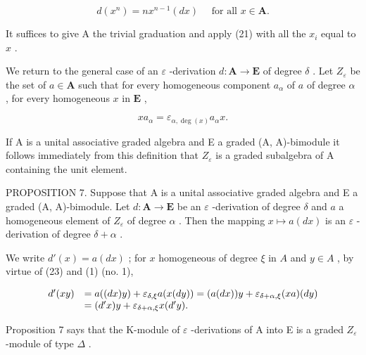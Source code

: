 \[
d (x ^ {n}) = n x ^ {n - 1} (d x) \quad \text { for all } x \in \mathbf {A}.\tag{22}
\]

It suffices to give A the trivial graduation and apply (21) with all the \(x_{i}\) equal to \(x\) .

We return to the general case of an \(\varepsilon\) -derivation \(d: \mathbf{A} \to \mathbf{E}\) of degree \(\delta\) . Let \(Z_{\varepsilon}\) be the set of \(a \in \mathbf{A}\) such that for every homogeneous component \(a_{\alpha}\) of \(a\) of degree \(\alpha\) , for every homogeneous \(x\) in \(\mathbf{E}\) ,

\[
x a _ {\alpha} = \varepsilon_ {\alpha , \deg (x)} a _ {\alpha} x.\tag{23}
\]

If A is a unital associative graded algebra and E a graded (A, A)-bimodule it follows immediately from this definition that \(Z_{\varepsilon}\) is a graded subalgebra of A containing the unit element.

PROPOSITION 7. Suppose that A is a unital associative graded algebra and E a graded (A, A)-bimodule. Let \(d: \mathbf{A} \to \mathbf{E}\) be an \(\varepsilon\) -derivation of degree \(\delta\) and \(a\) a homogeneous element of \(Z_{\varepsilon}\) of degree \(\alpha\) . Then the mapping \(x \mapsto a(dx)\) is an \(\varepsilon\) -derivation of degree \(\delta + \alpha\) .

We write \(d'(x) = a(dx)\) ; for \(x\) homogeneous of degree \(\xi\) in \(A\) and \(y \in A\) , by virtue of (23) and (1) (no. 1),

\[
\begin{array}{r l} d ^ {\prime} (x y) & = a ((d x) y) + \varepsilon_ {\delta , \xi} a (x (d y)) = (a (d x)) y + \varepsilon_ {\delta + \alpha , \xi} (x a) (d y) \\ & = (d ^ {\prime} x) y + \varepsilon_ {\delta + \alpha , \xi} x (d ^ {\prime} y). \end{array}
\]

Proposition 7 says that the K-module of \(\varepsilon\) -derivations of A into E is a graded \(Z_{\varepsilon}\) -module of type \(\Delta\) .

